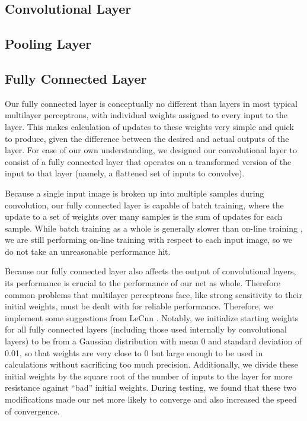 \documentclass[10pt,twocolumn,letterpaper]{article}
\begin{document}
\subsection{Convolutional Layer}

\subsection{Pooling Layer}

\subsection{Fully Connected Layer}

Our fully connected layer is conceptually no different than layers in most typical multilayer
perceptrons, with individual weights assigned to every input to the layer.
This makes calculation of updates to these weights very simple and quick to produce, given the
difference between the desired and actual outputs of the layer.
For ease of our own understanding, we designed our convolutional layer to consist of a
fully connected layer that operates on a transformed version of the input to that layer
(namely, a flattened set of inputs to convolve).

Because a single input image is broken up into multiple samples during convolution, our
fully connected layer is capable of batch training, where the update to a set of weights over
many samples is the sum of updates for each sample. While batch training as a whole is generally
slower than on-line training \cite{EfficientBackProp}, we are still performing on-line training
with respect to each input image, so we do not take an unreasonable performance hit.

Because our fully connected layer also affects the output of convolutional layers, its performance
is crucial to the performance of our net as whole. Therefore common problems that multilayer
perceptrons face, like strong sensitivity to their initial weights, must be dealt with for
reliable performance. Therefore, we implement some suggestions from LeCun
\etal \cite{EfficientBackProp}.
Notably, we initialize starting weights for all fully connected layers (including those used
internally by convolutional layers) to be from a Gaussian distribution with mean 0 and standard
deviation of 0.01, so that weights are very close to 0 but large enough to be used in calculations
without sacrificing too much precision.
Additionally, we divide these initial weights by the square root of the number of inputs to the
layer for more resistance against ``bad'' initial weights.
During testing, we found that these two modifications made our net more likely to converge and
also increased the speed of convergence.
\end{document}
